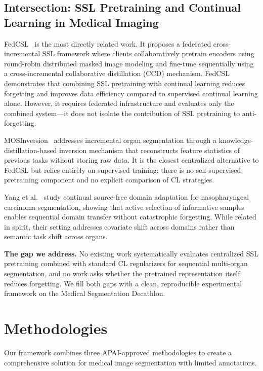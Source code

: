 \documentclass[conference]{IEEEtran}
\begin{document}
\subsection{Intersection: SSL Pretraining and Continual Learning in Medical Imaging}

FedCSL~\cite{fedcsl2025} is the most directly related work. It proposes a federated cross-incremental SSL framework where clients collaboratively pretrain encoders using round-robin distributed masked image modeling and fine-tune sequentially using a cross-incremental collaborative distillation (CCD) mechanism. FedCSL demonstrates that combining SSL pretraining with continual learning reduces forgetting and improves data efficiency compared to supervised continual learning alone. However, it requires federated infrastructure and evaluates only the combined system—it does not isolate the contribution of SSL pretraining to anti-forgetting.

MOSInversion~\cite{kim2025mosinversion} addresses incremental organ segmentation through a knowledge-distillation-based inversion mechanism that reconstructs feature statistics of previous tasks without storing raw data. It is the closest centralized alternative to FedCSL but relies entirely on supervised training; there is no self-supervised pretraining component and no explicit comparison of CL strategies.

Yang et al.~\cite{yang2025continual} study continual source-free domain adaptation for nasopharyngeal carcinoma segmentation, showing that active selection of informative samples enables sequential domain transfer without catastrophic forgetting. While related in spirit, their setting addresses covariate shift across domains rather than semantic task shift across organs.

\textbf{The gap we address.} No existing work systematically evaluates centralized SSL pretraining combined with standard CL regularizers for sequential multi-organ segmentation, and no work asks whether the pretrained representation itself reduces forgetting. We fill both gaps with a clean, reproducible experimental framework on the Medical Segmentation Decathlon.

\section{Methodologies}

Our framework combines three APAI-approved methodologies to create a comprehensive solution for medical image segmentation with limited annotations.
\end{document}
